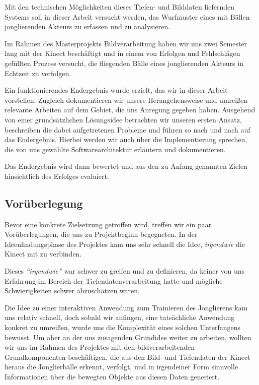 \documentclass[12pt,a4paper,ngerman]{scrartcl}
\begin{document}
Mit den technischen Möglichkeiten dieses Tiefen- und Bilddaten liefernden Systems
soll in dieser Arbeit versucht werden, das Wurfmuster eines mit Bällen jonglierenden
Akteurs zu erfassen und zu analysieren. %

Im Rahmen des Masterprojekts Bildverarbeitung haben wir uns zwei Semester lang mit
der Kinect beschäftigt und in einem von Erfolgen und Fehlschlägen gefüllten Prozess
versucht, die fliegenden Bälle eines jonglierenden Akteurs in Echtzeit zu verfolgen.

Ein funktionierendes Endergebnis wurde erzielt, das wir in dieser Arbeit vorstellen.
Zugleich dokumentieren wir unsere Herangehensweise und umreißen relevante Arbeiten
auf dem Gebiet, die uns Anregung gegeben haben. Ausgehend von einer grundsätzlichen
Lösungsidee betrachten wir unseren ersten Ansatz, beschreiben die dabei aufgetretenen
Probleme und führen so nach und nach auf das Endergebnis. Hierbei werden wir auch
über die Implementierung sprechen, die von uns gewählte Softwarearchitektur
erläutern und dokumentieren.

Das Endergebnis wird dann bewertet und aus den zu Anfang genannten Zielen
hinsichtlich des Erfolges evaluiert. %

\newpage

\subsection{Vorüberlegung}

Bevor eine konkrete Zielsetzung getroffen wird, treffen wir ein paar Vorüberlegungen,
die uns zu Projektbeginn begegneten. In der Ideenfindungsphase des Projektes kam uns
sehr schnell die Idee, \textit{irgendwie} die Kinect mit  zu
verbinden.

Dieses \textit{``irgendwie''} war schwer zu greifen und zu definieren, da keiner von
uns Erfahrung im Bereich der Tiefendatenverarbeitung hatte und mögliche
Schwierigkeiten schwer abzuschätzen waren.

Die Idee zu einer interaktiven Anwendung zum Trainieren des Jonglierens kam uns
relativ schnell, doch sobald wir anfingen, eine tatsächliche Anwendung konkret zu
umreißen, wurde uns die Komplexität eines solchen Unterfangens bewusst. Um aber
an der uns zusagenden Grundidee weiter zu arbeiten, wollten wir uns im Rahmen des
Projektes mit den bildverarbeitenden Grundkomponenten beschäftigen, die aus
den Bild- und Tiefendaten der Kinect heraus die Jonglierbälle erkennt, verfolgt,
und in irgendeiner Form sinnvolle Informationen über die bewegten Objekte aus diesen
Daten generiert.
\end{document}
